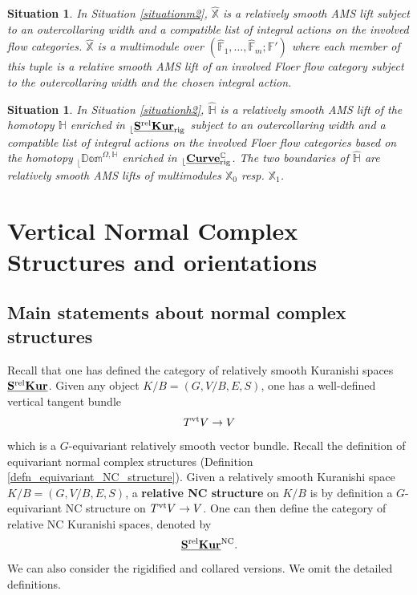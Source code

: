 \documentclass[reqno, 10pt]{amsart}
\numberwithin{equation}{section}
\numberwithin{equation}{section}
\newtheorem{situationm}{Situation}
\newtheorem{situationh}{Situation}
\theoremstyle{definition}
\theoremstyle{remark}
\newcommand{\beqn}{\begin{equation*}}
\newcommand{\eeqn}{\end{equation*}}
\newcommand{\mb}{\mathbb}
\renewcommand{\outer}{{}_{\lfloor}}
\newcommand{\uds}[1]{\underline{\smash{#1}}}
\begin{document}
\begin{situationm}\label{situationm3}
In Situation \ref{situationm2}, $\hat{\mb X}$ is a relatively smooth AMS lift subject to an outercollaring width and a compatible list of integral actions on the involved flow categories. $\hat {\mb X}$ is a multimodule over $(\hat {\mb F}_1, \ldots, \hat {\mb F}_m; \hat {\mb F}')$ where each member of this tuple is a relative smooth AMS lift of an involved Floer flow category subject to the outercollaring width and the chosen integral action. 
\end{situationm}

\begin{situationh}\label{situationh3}
In Situation \ref{situationh2}, $\hat {\mb H}$ is a relatively smooth AMS lift of the homotopy ${\mb H}$ enriched in $\outer \uds{\bf S^{\rm rel} Kur}_{\rm rig}$ subject to an outercollaring width and a compatible list of integral actions on the involved Floer flow categories based on the homotopy $\outer \mb{Dom}^{\Omega, {\mb H}}$ enriched in $\outer \uds{\bf Curve}_{\rm rig}^{\mb C}$. The two boundaries of $\hat {\mb H}$ are relatively smooth AMS lifts of multimodules $\mb{X}_0$ resp. $\mb{X}_1$. 
\end{situationh}





\section{Vertical Normal Complex Structures and orientations}\label{section_NC_structure}






\subsection{Main statements about normal complex structures}

Recall that one has defined the category of relatively smooth Kuranishi spaces $\uds{\bf S^{\rm rel}Kur}$. Given any object $K/B = (G, V/B, E, S)$, one has a well-defined vertical tangent bundle
\beqn
T^{\rm vt} V \to V
\eeqn
which is a $G$-equivariant relatively smooth vector bundle. Recall the definition of equivariant normal complex structures (Definition \ref{defn_equivariant_NC_structure}). Given a relatively smooth Kuranishi space $K/B = (G, V/B, E, S)$, a {\bf relative NC structure} on $K/B$ is by definition a $G$-equivariant NC structure on $T^{\rm vt} V \to V$. One can then define the category of relative NC Kuranishi spaces, denoted by 
\beqn
\uds{\bf S^{\rm rel} Kur}^{\rm NC}.
\eeqn
We can also consider the rigidified and collared versions. We omit the detailed definitions.
\end{document}
